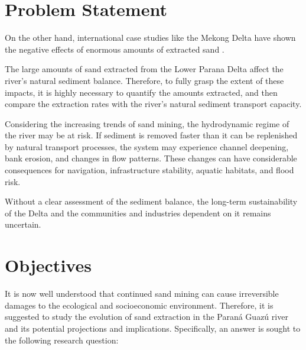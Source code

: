 \section{Problem Statement}

On the other hand, international case studies like the Mekong Delta have shown the negative effects of enormous amounts of extracted sand \autocite{brunierRecentMorphologicalChanges2014}. 


The large amounts of sand extracted from the Lower Parana Delta affect the river's natural sediment balance. Therefore, to fully grasp the extent of these impacts, it is highly necessary to quantify the amounts extracted, and then compare the extraction rates with the river’s natural sediment transport capacity.

Considering the increasing trends of sand mining, the hydrodynamic regime of the river may be at risk. If sediment is removed faster than it can be replenished by natural transport processes, the system may experience channel deepening, bank erosion, and changes in flow patterns. These changes can have considerable consequences for navigation, infrastructure stability, aquatic habitats, and flood risk. 

Without a clear assessment of the sediment balance, the long-term sustainability of the Delta and the communities and industries dependent on it remains uncertain.

\section{Objectives}


It is now well understood that continued sand mining can cause irreversible damages to the ecological and socioeconomic environment. Therefore, it is suggested to study the evolution of sand extraction in the Paraná Guazú river and its potential projections and implications. Specifically, an answer is sought to the following research question:

